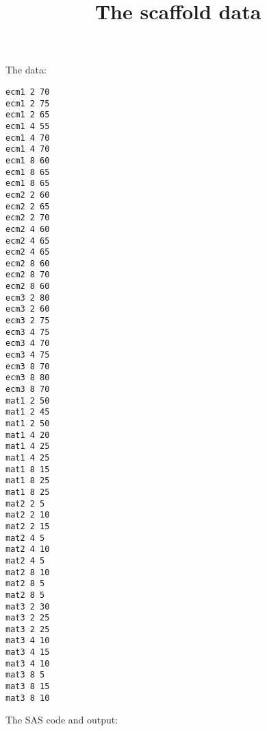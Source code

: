 \documentclass{article}
\title{The scaffold data}
\begin{document}
\maketitle
The data:
\begin{verbatim}
ecm1 2 70
ecm1 2 75
ecm1 2 65
ecm1 4 55
ecm1 4 70
ecm1 4 70
ecm1 8 60
ecm1 8 65
ecm1 8 65
ecm2 2 60
ecm2 2 65
ecm2 2 70
ecm2 4 60
ecm2 4 65
ecm2 4 65
ecm2 8 60
ecm2 8 70
ecm2 8 60
ecm3 2 80
ecm3 2 60
ecm3 2 75
ecm3 4 75
ecm3 4 70
ecm3 4 75
ecm3 8 70
ecm3 8 80
ecm3 8 70
mat1 2 50
mat1 2 45
mat1 2 50
mat1 4 20
mat1 4 25
mat1 4 25
mat1 8 15
mat1 8 25
mat1 8 25
mat2 2 5
mat2 2 10
mat2 2 15
mat2 4 5
mat2 4 10
mat2 4 5
mat2 8 10
mat2 8 5
mat2 8 5
mat3 2 30
mat3 2 25
mat3 2 25
mat3 4 10
mat3 4 15
mat3 4 10
mat3 8 5
mat3 8 15
mat3 8 10
\end{verbatim}
The SAS code and output:
\end{document}
